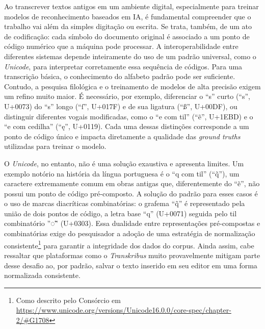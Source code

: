 \documentclass[portuguese]{textolivre}
\begin{document}
Ao transcrever textos antigos em um ambiente digital, especialmente para treinar modelos de reconhecimento baseados em IA, é fundamental compreender que o trabalho vai além da simples digitação ou escrita. Se trata, também, de um ato de codificação: cada símbolo do documento original é associado a um ponto de código numérico que a máquina pode processar. A interoperabilidade entre diferentes sistemas depende inteiramente do uso de um padrão universal, como o \textit{Unicode}, para interpretar corretamente essa sequência de códigos. Para uma transcrição básica, o conhecimento do alfabeto padrão pode ser suficiente. Contudo, a pesquisa filológica e o treinamento de modelos de alta precisão exigem um refino muito maior. É necessário, por exemplo, diferenciar o “s” curto (“s”, U+0073) do “s” longo (“ſ”, U+017F) e de sua ligatura (“ß”, U+00DF), ou distinguir diferentes vogais modificadas, como o “e com til” (“ẽ”, U+1EBD) e o “e com cedilha” (“ę”, U+0119). Cada uma dessas distinções corresponde a um ponto de código único e impacta diretamente a qualidade das \textit{ground truths} utilizadas para treinar o modelo.

O \textit{Unicode}, no entanto, não é uma solução exaustiva e apresenta limites. Um exemplo notório na história da língua portuguesa é o “q com til” (“q̃”), um caractere extremamente comum em obras antigas que, diferentemente do “ẽ”, não possui um ponto de código pré-composto. A solução do padrão para esses casos é o uso de marcas diacríticas combinatórias: o grafema “q̃” é representado pela união de dois pontos de código, a letra base “q” (U+0071) seguida pelo til combinatório ''◌̃'' (U+0303). Essa dualidade entre representações pré-compostas e combinatórias exige do pesquisador a adoção de uma estratégia de normalização consistente\footnote{Como descrito pelo Consórcio em \url{https://www.unicode.org/versions/Unicode16.0.0/core-spec/chapter-2/\#G1708}} para garantir a integridade dos dados do corpus. Ainda assim, cabe ressaltar que plataformas como o \textit{Transkribus} muito provavelmente mitigam parte desse desafio ao, por padrão, salvar o texto inserido em seu editor em uma forma normalizada consistente.
\end{document}
